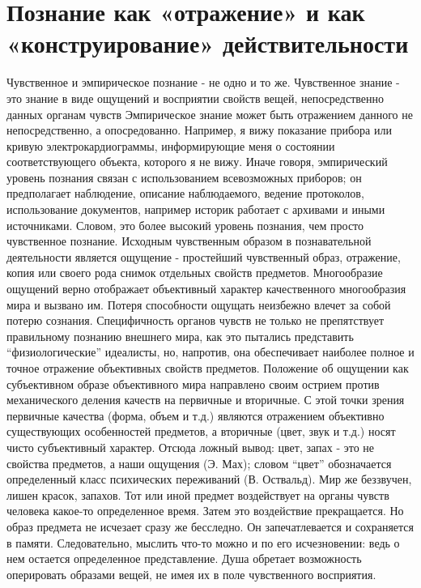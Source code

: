 \documentclass[12pt]{article}
\begin{document}
\section{Познание как «отражение» и как «конструирование» действительности}
Чувственное и эмпирическое познание - не одно и то же. Чувственное знание - это знание в виде ощущений и
восприятии свойств вещей, непосредственно данных органам чувств
Эмпирическое знание может быть отражением данного не непосредственно, а опосредованно. Например, я
вижу  показание  прибора  или  кривую  электрокардиограммы,  информирующие  меня  о  состоянии
соответствующего  объекта,  которого  я  не  вижу.  Иначе  говоря,  эмпирический  уровень  познания  связан  с
использованием  всевозможных  приборов;  он  предполагает  наблюдение,  описание  наблюдаемого,  ведение
протоколов, использование документов, например историк работает с архивами и иными источниками. Словом,
это более высокий уровень познания, чем просто чувственное познание.
Исходным  чувственным  образом  в  познавательной  деятельности  является  ощущение  -  простейший
чувственный образ, отражение, копия или своего рода снимок отдельных свойств предметов. Многообразие
ощущений верно отображает объективный характер качественного многообразия мира и вызвано им. Потеря
способности ощущать неизбежно влечет за собой потерю сознания.
Специфичность органов чувств не только не препятствует правильному познанию внешнего мира, как это
пытались представить “физиологические” идеалисты, но, напротив, она обеспечивает наиболее полное и точное
отражение объективных свойств предметов.
Положение  об  ощущении  как  субъективном  образе  объективного  мира  направлено  своим  острием  против
механического деления качеств на первичные и вторичные. С этой точки зрения первичные качества (форма,
объем и т.д.) являются отражением объективно существующих особенностей предметов, а вторичные (цвет, звук
и т.д.) носят чисто субъективный характер. Отсюда ложный вывод: цвет, запах - это не свойства предметов, а
наши ощущения (Э.  Мах);  словом  “цвет” обозначается  определенный  класс психических переживаний  (В.
Оствальд). Мир же беззвучен, лишен красок, запахов.
Тот  или  иной  предмет  воздействует  на  органы  чувств  человека  какое-то  определенное  время.  Затем  это
воздействие  прекращается.  Но  образ  предмета  не  исчезает  сразу  же  бесследно.  Он  запечатлевается  и
сохраняется в памяти. Следовательно, мыслить что-то можно и по его исчезновении: ведь о нем остается
определенное представление. Душа обретает возможность оперировать образами вещей, не имея их в поле
чувственного восприятия.
\end{document}
